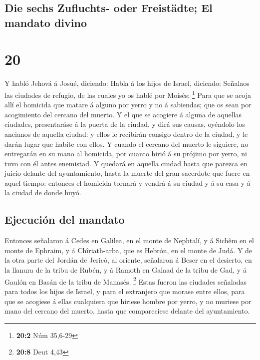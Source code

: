 \hypertarget{die-sechs-zufluchts--oder-freistuxe4dte-el-mandato-divino}{%
\subsection{Die sechs Zufluchts- oder Freistädte; El mandato
divino}\label{die-sechs-zufluchts--oder-freistuxe4dte-el-mandato-divino}}

\hypertarget{section-19}{%
\section{20}\label{section-19}}

 Y habló Jehová á Josué, diciendo:  Habla á los
hijos de Israel, diciendo: Señalaos las ciudades de refugio, de las
cuales yo os hablé por Moisés; \footnote{\textbf{20:2} Núm 35,6-29}
 Para que se acoja allí el homicida que matare á alguno por
yerro y no á sabiendas; que os sean por acogimiento del cercano del
muerto.  Y el que se acogiere á alguna de aquellas ciudades,
presentaráse á la puerta de la ciudad, y dirá sus causas, oyéndolo los
ancianos de aquella ciudad: y ellos le recibirán consigo dentro de la
ciudad, y le darán lugar que habite con ellos.  Y cuando el
cercano del muerto le siguiere, no entregarán en su mano al homicida,
por cuanto hirió á su prójimo por yerro, ni tuvo con él antes enemistad.
 Y quedará en aquella ciudad hasta que parezca en juicio
delante del ayuntamiento, hasta la muerte del gran sacerdote que fuere
en aquel tiempo: entonces el homicida tornará y vendrá á su ciudad y á
su casa y á la ciudad de donde huyó.

\hypertarget{ejecuciuxf3n-del-mandato}{%
\subsection{Ejecución del mandato}\label{ejecuciuxf3n-del-mandato}}

 Entonces señalaron á Cedes en Galilea, en el monte de
Nephtalí, y á Sichêm en el monte de Ephraim, y á Chîriath-arba, que es
Hebrón, en el monte de Judá.  Y de la otra parte del Jordán
de Jericó, al oriente, señalaron á Beser en el desierto, en la llanura
de la tribu de Rubén, y á Ramoth en Galaad de la tribu de Gad, y á
Gaulón en Basán de la tribu de Manasés. \footnote{\textbf{20:8} Deut
  4,43}  Estas fueron las ciudades señaladas para todos los
hijos de Israel, y para el extranjero que morase entre ellos, para que
se acogiese á ellas cualquiera que hiriese hombre por yerro, y no
muriese por mano del cercano del muerto, hasta que compareciese delante
del ayuntamiento.


